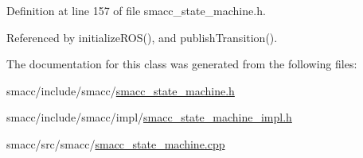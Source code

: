 Definition at line 157 of file smacc\+\_\+state\+\_\+machine.\+h.



Referenced by initialize\+R\+O\+S(), and publish\+Transition().



The documentation for this class was generated from the following files\+:\begin{DoxyCompactItemize}
\item 
smacc/include/smacc/\hyperlink{smacc__state__machine_8h}{smacc\+\_\+state\+\_\+machine.\+h}\item 
smacc/include/smacc/impl/\hyperlink{smacc__state__machine__impl_8h}{smacc\+\_\+state\+\_\+machine\+\_\+impl.\+h}\item 
smacc/src/smacc/\hyperlink{smacc__state__machine_8cpp}{smacc\+\_\+state\+\_\+machine.\+cpp}\end{DoxyCompactItemize}
